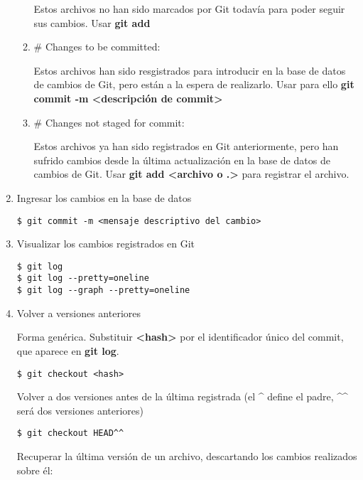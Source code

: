 \documentclass[a4paper,oneside]{article}
\begin{document}
\begin{enumerate}
\begin{enumerate}
        Estos archivos no han sido marcados por Git todavía para poder seguir sus cambios. Usar \textbf{git add}
      \item \# Changes to be committed:

        Estos archivos han sido resgistrados para introducir en la base de datos de cambios de Git, pero están a la espera de realizarlo. Usar para ello \textbf{git commit -m <descripción de commit>}
      \item \# Changes not staged for commit:

        Estos archivos ya han sido registrados en Git anteriormente, pero han sufrido cambios desde la última actualización en la base de datos de cambios de Git. Usar \textbf{git add <archivo o .>} para registrar el archivo.
    \end{enumerate}

  \item Ingresar los cambios en la base de datos

    \begin{verbatim}
$ git commit -m <mensaje descriptivo del cambio>
    \end{verbatim}

  \item Visualizar los cambios registrados en Git

    \begin{verbatim}
$ git log
$ git log --pretty=oneline
$ git log --graph --pretty=oneline
    \end{verbatim}

  \item Volver a versiones anteriores

    Forma genérica. Substituir \textbf{<hash>} por el identificador único del commit, que aparece en \textbf{git log}.

    \begin{verbatim}
$ git checkout <hash>
    \end{verbatim}

    Volver a dos versiones antes de la última registrada (el \textasciicircum{} define el padre, \textasciicircum{}\textasciicircum{} será dos versiones anteriores)

    \begin{verbatim}
$ git checkout HEAD^^
    \end{verbatim}

Recuperar la última versión de un archivo, descartando los cambios realizados sobre él:


\end{enumerate}
\end{document}
